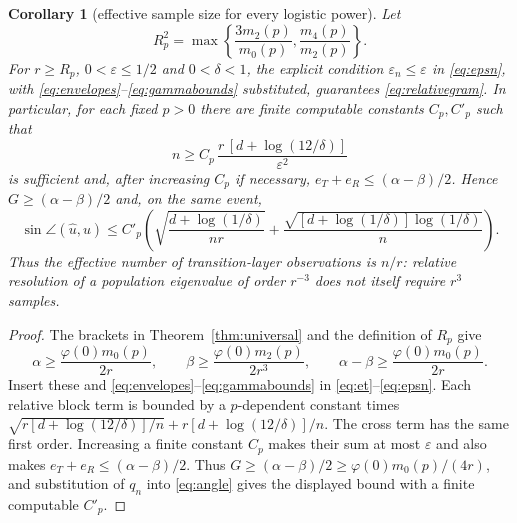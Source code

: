 \documentclass[11pt]{article}
\newtheorem{corollary}[theorem]{Corollary}
\begin{document}
\begin{corollary}[effective sample size for every logistic power]
\label{cor:effective}
Let
\[
 R_p^2=\max\left\{\frac{3m_2(p)}{m_0(p)},\frac{m_4(p)}{m_2(p)}\right\}.
\]
For $r\ge R_p$, $0<\varepsilon\le1/2$ and $0<\delta<1$, the explicit condition
$\varepsilon_n\le\varepsilon$ in \eqref{eq:epsn}, with
\eqref{eq:envelopes}--\eqref{eq:gammabounds} substituted, guarantees
\eqref{eq:relativegram}.  In particular, for each fixed $p>0$ there are finite computable constants $C_p,C'_p$
such that
\begin{equation}
 n\ge C_p\,\frac{r\,[d+\log(12/\delta)]}{\varepsilon^2}
 \label{eq:samplesufficient}
\end{equation}
is sufficient and, after increasing $C_p$ if necessary,
$e_T+e_R\le(\alpha-\beta)/2$.  Hence $G\ge(\alpha-\beta)/2$ and, on the same event,
\[
 \sin\angle(\widehat u,u)
 \le C'_p\!\left(\sqrt{\frac{d+\log(1/\delta)}{nr}}
 +\frac{\sqrt{[d+\log(1/\delta)]\log(1/\delta)}}{n}\right).
\]
Thus the effective number of transition-layer observations is $n/r$: relative resolution of a population
eigenvalue of order $r^{-3}$ does not itself require $r^3$ samples.
\end{corollary}

\begin{proof}
The brackets in Theorem~\ref{thm:universal} and the definition of $R_p$ give
\[
 \alpha\ge\frac{\varphi(0)m_0(p)}{2r},\qquad
 \beta\ge\frac{\varphi(0)m_2(p)}{2r^3},\qquad
 \alpha-\beta\ge\frac{\varphi(0)m_0(p)}{2r}.
\]
Insert these and \eqref{eq:envelopes}--\eqref{eq:gammabounds} in
\eqref{eq:et}--\eqref{eq:epsn}.  Each relative block term is bounded by a $p$-dependent constant times
$\sqrt{r[d+\log(12/\delta)]/n}+r[d+\log(12/\delta)]/n$.
The cross term has the same first order.  Increasing a finite constant $C_p$ makes their sum at most
$\varepsilon$ and also makes $e_T+e_R\le(\alpha-\beta)/2$.  Thus
$G\ge(\alpha-\beta)/2\ge\varphi(0)m_0(p)/(4r)$, and substitution of $q_n$ into
\eqref{eq:angle} gives the displayed bound with a finite computable $C'_p$.
\end{proof}
\end{document}
